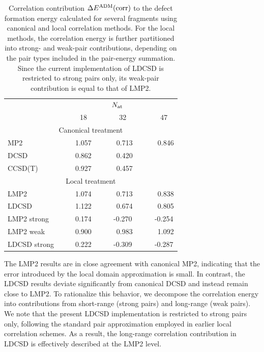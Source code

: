 \documentclass[aip,jcp,reprint]{revtex4-2}
\begin{document}
\begin{table}[h]
  \centering
  \caption{Correlation contribution $\Delta E^{\rm ADM}({\rm corr})$ to the defect formation energy calculated for several fragments using canonical and local correlation methods. For the local methods, the correlation energy is further partitioned into strong- and weak-pair contributions, depending on the pair types included in the pair-energy summation. Since the current implementation of LDCSD is restricted to strong pairs only, its weak-pair contribution is equal to that of LMP2.}
    \begin{tabular}{lcccccc}
    \hline\hline
    &\multicolumn{6}{c}{$N_{\rm at}$}\\
    &&18 && 32 &&47 \\
    \hline
    
    \multicolumn{7}{c}{   Canonical treatment}\\
   MP2           &~~ & 1.057 &~~ & ~0.713 &~~ & ~0.846 \\
   DCSD          & & 0.862 & & ~0.420  &&       \\
   CCSD(T)       &  & 0.927 & & ~0.457 & &       \\
    \hline
    \multicolumn{7}{c}{    Local treatment}\\
   LMP2          & & 1.074 & & ~0.713 & & ~0.838 \\
   LDCSD         & & 1.122 & & ~0.674 & & ~0.805 \\
    \hline   
   LMP2 strong   & & 0.174 & &-0.270 & & -0.254 \\
   LMP2 weak     & & 0.900 & & ~0.983 & &  ~1.092 \\
   LDCSD strong  & & 0.222  &&-0.309 & &  -0.287 \\
    \hline \hline
    \end{tabular}
    \label{tab:local}
\end{table}


The LMP2 results are in close agreement with canonical MP2, indicating that the error introduced by the local domain approximation is small. In contrast, the LDCSD results deviate significantly from canonical DCSD and instead remain close to LMP2.  To rationalize this behavior, we decompose the correlation energy into contributions from short-range (strong pairs) and long-range (weak pairs). We note that the present LDCSD implementation is restricted to strong pairs only, following the standard pair approximation employed in earlier local correlation schemes.\cite{Schuetz2001_LCCSD} As a result, the long-range correlation contribution in LDCSD is effectively described at the LMP2 level.
\end{document}

